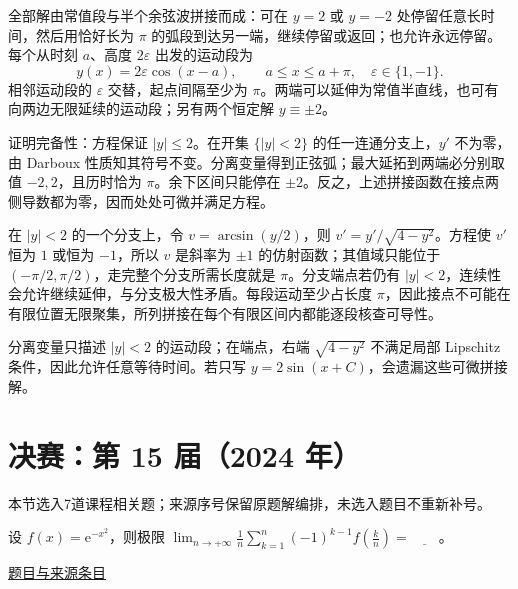 \documentclass[12pt,fontset=fandol]{ctexart}
\begin{document}
\begin{solve}\label{ans:fin14-low:10}

全部解由常值段与半个余弦波拼接而成：可在 $y=2$ 或 $y=-2$ 处停留任意长时间，然后用恰好长为 $\pi$ 的弧段到达另一端，继续停留或返回；也允许永远停留。每个从时刻 $a$、高度 $2\varepsilon$ 出发的运动段为
\[
y(x)=2\varepsilon\cos(x-a),\qquad a\le x\le a+\pi,\quad\varepsilon\in\{1,-1\}.
\]
相邻运动段的 $\varepsilon$ 交替，起点间隔至少为 $\pi$。两端可以延伸为常值半直线，也可有向两边无限延续的运动段；另有两个恒定解 $y\equiv\pm2$。

证明完备性：方程保证 $|y|\le2$。在开集 $\{|y|<2\}$ 的任一连通分支上，$y'$ 不为零，由 Darboux 性质知其符号不变。分离变量得到正弦弧；最大延拓到两端必分别取值 $-2,2$，且历时恰为 $\pi$。余下区间只能停在 $\pm2$。反之，上述拼接函数在接点两侧导数都为零，因而处处可微并满足方程。

在 $|y|<2$ 的一个分支上，令 $v=\arcsin(y/2)$，则 $v'=y'/\sqrt{4-y^2}$。方程使 $v'$ 恒为 $1$ 或恒为 $-1$，所以 $v$ 是斜率为 $\pm1$ 的仿射函数；其值域只能位于 $(-\pi/2,\pi/2)$，走完整个分支所需长度就是 $\pi$。分支端点若仍有 $|y|<2$，连续性会允许继续延伸，与分支极大性矛盾。每段运动至少占长度 $\pi$，因此接点不可能在有限位置无限聚集，所列拼接在每个有限区间内都能逐段核查可导性。

\end{solve}

\begin{remark}[方法与条件]分离变量只描述 $|y|<2$ 的运动段；在端点，右端 $\sqrt{4-y^2}$ 不满足局部 Lipschitz 条件，因此允许任意等待时间。若只写 $y=2\sin(x+C)$，会遗漏这些可微拼接解。\end{remark}

\section{决赛：第 15 届（2024 年）}

本节选入7道课程相关题；来源序号保留原题解编排，未选入题目不重新补号。

\begin{example}[来源序号2]\label{ex:fin15-high:2}\label{pr:fin15-high:2}

设 $f(x) = \mathrm{e}^{-x^{2}}$，则极限
$\lim_{n\rightarrow+\infty}\frac{1}{n}\sum_{k=1}^{n}(-1)^{k-1}f\left(\frac{k}{n}\right) = \underline{\qquad}$。

\par\href{https://github.com/lzxcr/cmc-mathematics/blob/64916fa1fdbc3e444a652eca204d5669058ee321/src/problems/finals/15/02.md}{题目与来源条目}

\end{example}
\end{document}

